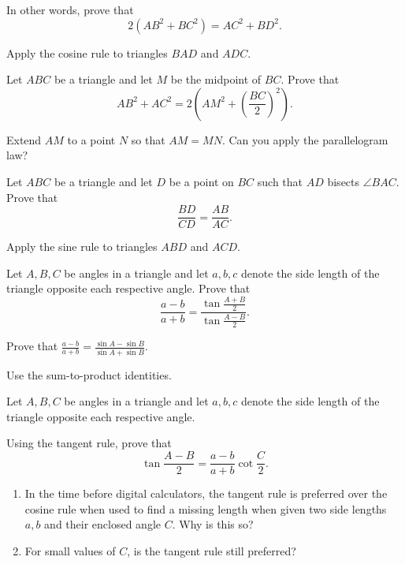 \documentclass[../jarvis.tex]{subfiles}
\begin{document}
In other words, prove that
$$2(AB^2+BC^2)=AC^2+BD^2.$$
\begin{hints}
    \begin{hint}
        Apply the cosine rule to triangles $BAD$ and $ADC$.
    \end{hint}
\end{hints}
Let $ABC$ be a triangle and let $M$ be the midpoint of $BC$. Prove that 
$$AB^2+AC^2=2(AM^2+\left(\frac{BC}{2}\right)^2).$$
\begin{hints}
    \begin{hint}
        Extend $AM$ to a point $N$ so that $AM=MN$. Can you apply the parallelogram law?
    \end{hint}
\end{hints}
Let $ABC$ be a triangle and let $D$ be a point on $BC$ such that $AD$ bisects $\angle BAC$. Prove that $$\frac{BD}{CD}=\frac{AB}{AC}.$$
\begin{hints}
    \begin{hint}
        Apply the sine rule to triangles $ABD$ and $ACD$.
    \end{hint}
\end{hints}
 Let $A,B,C$ be angles in a triangle and let $a,b,c$ denote the side length of the triangle opposite each respective angle. Prove that
$$\frac{a-b}{a+b}=\frac{\tan{\frac{A+B}{2}}}{\tan{\frac{A-B}{2}}}.$$
\begin{hints}
    \begin{hint}
        Prove that $\frac{a-b}{a+b}=\frac{\sin{A}-\sin{B}}{\sin{A}+\sin{B}}.$
    \end{hint}
    \begin{hint}
        Use the sum-to-product identities.
    \end{hint}
\end{hints}
 Let $A,B,C$ be angles in a triangle and let $a,b,c$ denote the side length of the triangle opposite each respective angle.

Using the tangent rule, prove that $$\tan{\frac{A-B}{2}}=\frac{a-b}{a+b}\cot{\frac{C}{2}}.$$

\begin{enumerate}
    \item In the time before digital calculators, the tangent rule is preferred over the cosine rule when used to find a missing length when given two side lengths $a,b$ and their enclosed angle $C$. Why is this so?
    \item For small values of $C$, is the tangent rule still preferred?
\end{enumerate}
\end{document}

